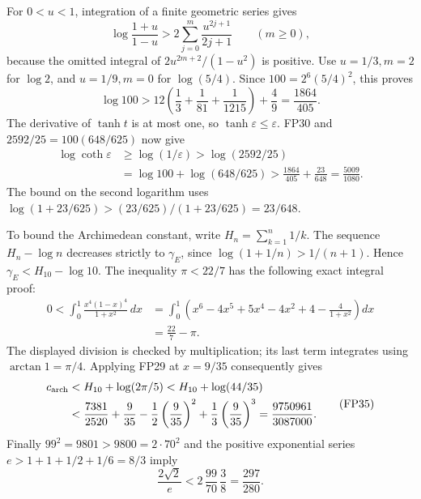 For \(0<u<1\), integration of a finite geometric series gives
\[
 \log\frac{1+u}{1-u}
 >2\sum_{j=0}^m\frac{u^{2j+1}}{2j+1}\qquad(m\ge0),
 \tag{FP31}\label{fp:fpb:log-lower}
\]
because the omitted integral of
\(2u^{2m+2}/(1-u^2)\) is positive.
Use \(u=1/3,m=2\) for \(\log2\), and \(u=1/9,m=0\) for
\(\log(5/4)\). Since \(100=2^6(5/4)^2\), this proves
\[
 \log100>
 12\left(\frac13+\frac1{81}+\frac1{1215}\right)+\frac49
 =\frac{1864}{405}.
 \tag{FP32}
\]
The derivative of \(\tanh t\) is at most one, so
\(\tanh\varepsilon\le\varepsilon\). FP30 and
\(2592/25=100(648/625)\) now give
\[
 \begin{aligned}
 \log\coth\varepsilon
 &\ge\log(1/\varepsilon)>\log(2592/25)\\
 &=\log100+\log(648/625)
 >\frac{1864}{405}+\frac{23}{648}
 =\frac{5009}{1080}.
 \end{aligned}
 \tag{FP33}\label{fp:fpb:coth-two}
\]
The bound on the second logarithm uses
\(\log(1+23/625)>(23/625)/(1+23/625)=23/648\).

To bound the Archimedean constant, write
\(H_n=\sum_{k=1}^n1/k\). The sequence \(H_n-\log n\) decreases
strictly to \(\gamma_E\), since
\(\log(1+1/n)>1/(n+1)\). Hence
\(\gamma_E<H_{10}-\log10\).
The inequality \(\pi<22/7\) has the following exact integral proof:
\[
 \begin{aligned}
 0<\int_0^1\frac{x^4(1-x)^4}{1+x^2}\,dx
 &=\int_0^1\left(x^6-4x^5+5x^4-4x^2+4
                              -\frac4{1+x^2}\right)dx\\
 &=\frac{22}{7}-\pi.
 \end{aligned}
 \tag{FP34}
\]
The displayed division is checked by multiplication; its last
term integrates using \(\arctan1=\pi/4\).
Applying FP29 at \(x=9/35\) consequently gives
\[
 \begin{aligned}
 c_{\rm arch}
 &<H_{10}+\log(2\pi/5)
 <H_{10}+\log(44/35)\\
 &<\frac{7381}{2520}
       +\frac9{35}-\frac12\left(\frac9{35}\right)^2
                     +\frac13\left(\frac9{35}\right)^3
 =\frac{9750961}{3087000}.
 \end{aligned}
 \tag{FP35}\label{fp:fpb:carch}
\]
Finally \(99^2=9801>9800=2\cdot70^2\) and the positive
exponential series \(e>1+1+1/2+1/6=8/3\) imply
\[
 \frac{2\sqrt2}{e}
 <2\,\frac{99}{70}\,\frac38=\frac{297}{280}.
 \tag{FP36}\label{fp:fpb:sqrt-two}
\]

